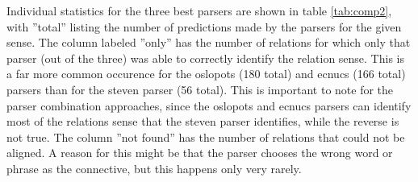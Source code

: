 \documentclass[10pt,notitlepage]{scrartcl}
\begin{document}
\begin{table}[htbp]
\centering
{}
\caption{Sense agreement (implicit and explicit) between oslopots, ecnucs and steven}
\label{tab:comp1}
\end{table}

Individual statistics for the three best parsers are shown in table \ref{tab:comp2}, with ''total'' listing the number of predictions made by the parsers for the given sense. The column labeled ''only'' has the number of relations for which only that parser (out of the three) was able to correctly identify the relation sense. This is a far more common occurence for the oslopots (180 total) and ecnucs (166 total) parsers than for the steven parser (56 total). This is important to note for the parser combination approaches, since the oslopots and ecnucs parsers can identify most of the relations sense that the steven parser identifies, while the reverse is not true. The column ''not found'' has the number of relations that could not be aligned.  A reason for this might be that the parser chooses the wrong word or phrase as the connective, but this happens only very rarely.
\end{document}
